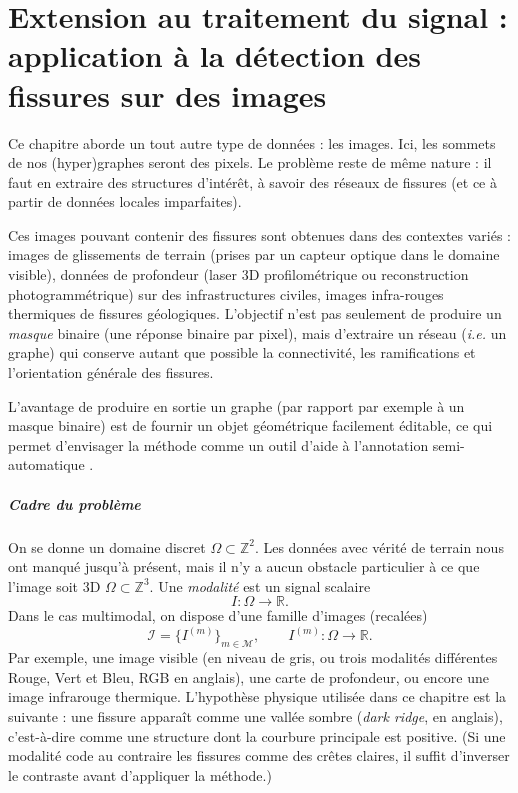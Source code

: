 

\chapter{Extension au traitement du signal : application à la détection des fissures sur des images}
\label{chap:frangi_fissures}

\providecommand{\Frangi}{\textnormal{\nom{Frangi}}}
\providecommand{\Hess}{\mathcal H}
\providecommand{\matnorm}[1]{\left\lvert\mkern-2mu\left\lvert\mkern-2mu\left\lvert #1 \right\rvert\mkern-2mu\right\rvert\mkern-2mu\right\rvert}

Ce chapitre aborde un tout autre type de données : les images.
Ici, les sommets de nos (hyper)graphes seront des pixels. Le problème reste de même nature : il faut en extraire des structures d'intérêt, à savoir des réseaux de fissures (et ce à partir de données locales imparfaites). 

Ces images pouvant contenir des fissures sont obtenues dans des contextes variés : images de glissements de terrain (prises par un capteur optique dans le domaine visible), données de profondeur (laser 3D profilométrique \cite{FIND2022} ou reconstruction photogrammétrique) sur des infrastructures civiles, images infra-rouges thermiques de fissures géologiques. L'objectif n'est pas seulement de produire un \emph{masque} binaire (une réponse binaire par pixel), mais d'extraire un réseau \cite{JeongTarabalkaNisseZerubia2016Curvilinear} (\emph{i.e.} un graphe) qui conserve autant que possible la connectivité, les ramifications et l'orientation générale des fissures.

L'avantage de produire en sortie un graphe (par rapport par exemple à un masque binaire) est de fournir un objet géométrique facilement éditable, ce qui permet d'envisager la méthode comme un outil d'aide à l'annotation semi-automatique \cite{CharbonnierMoliard2003CheminsMinimauxFissures}.



\paragraph{Cadre du problème}
On se donne un domaine discret $\Omega \subset \mathbb Z^2$. Les données avec vérité de terrain nous ont manqué jusqu'à présent, mais il n'y a aucun obstacle particulier à ce que l'image soit 3D $\Omega \subset \mathbb Z^3$. Une \emph{modalité} est un signal scalaire
\[
    I : \Omega \longrightarrow \mathbb R.
\]
Dans le cas multimodal, on dispose d'une famille d'images (recalées)
\[
    \mathcal I = \{I^{(m)}\}_{m\in\mathcal M},
    \qquad I^{(m)} : \Omega \longrightarrow \mathbb R.
\]
Par exemple, une image visible (en niveau de gris, ou trois modalités différentes Rouge, Vert et Bleu, RGB en anglais), une carte de profondeur, ou encore une image infrarouge thermique. L'hypothèse physique utilisée dans ce chapitre est la suivante : une fissure apparaît comme une vallée sombre (\emph{dark ridge}, en anglais), c'est-à-dire comme une structure dont la courbure principale est positive. (Si une modalité code au contraire les fissures comme des crêtes claires, il suffit d'inverser le contraste avant d'appliquer la méthode.)

